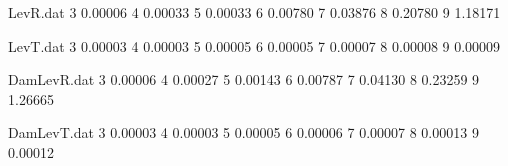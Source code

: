 
\usepackage{titlesec, blindtext, color} %
\newcommand{\hsp}{\hspace{20pt}} %
\titleformat{\chapter}[hang]{\Huge\bfseries}{\thechapter\hsp\textcolor{gray75}{|}\hsp}{0pt}{\Huge\bfseries}

\usepackage{pgfplots}
\usepackage{filecontents}
\usetikzlibrary{datavisualization}
\usetikzlibrary{datavisualization.formats.functions}
\begin{filecontents}{LevR.dat}
	3 0.00006
	4 0.00033
	5 0.00033
	6 0.00780
	7 0.03876
	8 0.20780
	9 1.18171
\end{filecontents}

\begin{filecontents}{LevT.dat}
	3 0.00003
	4 0.00003
	5 0.00005
	6 0.00005
	7 0.00007
	8 0.00008
	9 0.00009
\end{filecontents}

\begin{filecontents}{DamLevR.dat}
	3 0.00006
	4 0.00027
	5 0.00143
	6 0.00787
	7 0.04130
	8 0.23259
	9 1.26665
\end{filecontents}

\begin{filecontents}{DamLevT.dat}
	3 0.00003
	4 0.00003
	5 0.00005
	6 0.00006
	7 0.00007
	8 0.00013
	9 0.00012
\end{filecontents}
